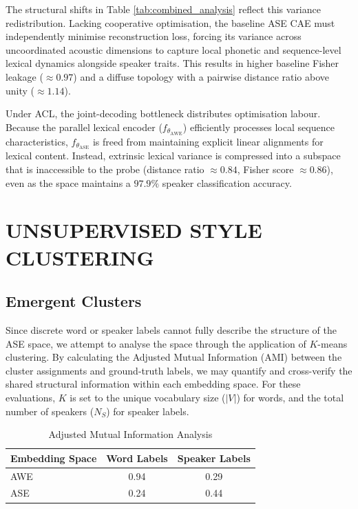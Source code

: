 \documentclass[conference,letterpaper]{IEEEtran}
\begin{document}
The structural shifts in Table \ref{tab:combined_analysis} reflect this variance redistribution. Lacking cooperative optimisation, the baseline ASE CAE must independently minimise reconstruction loss, forcing its variance across uncoordinated acoustic dimensions to capture local phonetic and sequence-level lexical dynamics alongside speaker traits. This results in higher baseline Fisher leakage ($\approx0.97$) and a diffuse topology with a pairwise distance ratio above unity ($\approx1.14$). 

Under ACL, the joint-decoding bottleneck distributes optimisation labour. Because the parallel lexical encoder ($f_{\theta_{\text{AWE}}}$) efficiently processes local sequence characteristics, $f_{\theta_{\text{ASE}}}$ is freed from maintaining explicit linear alignments for lexical content. Instead, extrinsic lexical variance is compressed into a subspace that is inaccessible to the probe (distance ratio $\approx0.84$, Fisher score $\approx0.86$), even as the space maintains a $97.9\%$ speaker classification accuracy.

\section{UNSUPERVISED STYLE CLUSTERING}
\label{sec: clusters}

\subsection{Emergent Clusters}


Since discrete word or speaker labels cannot fully describe the structure of the ASE space, we attempt to analyse the space through the application of $K$-means clustering. By calculating the Adjusted Mutual Information (AMI) between the cluster assignments and ground-truth labels, we may quantify and cross-verify the shared structural information within each embedding space. For these evaluations, $K$ is set to the unique vocabulary size ($|V|$) for words, and the total number of speakers ($N_S$) for speaker labels.
\vspace{-0.5cm}

\begin{table}[H]
    \centering
    \caption{Adjusted Mutual Information Analysis}
    \label{tab:clustering_metrics}
    \small
    \begin{tabular}{lcc}
        \toprule
        \textbf{Embedding Space} & \textbf{Word Labels} & \textbf{Speaker Labels} \\
        \midrule
        AWE & 0.94 & 0.29 \\
        ASE & 0.24 & 0.44 \\  
        \bottomrule
    \end{tabular}
\end{table}
\end{document}
